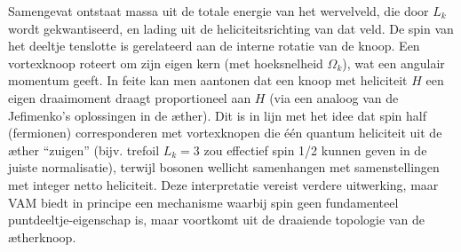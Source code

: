 Samengevat ontstaat massa uit de totale energie van het wervelveld, die door $L_k$ wordt gekwantiseerd, en lading uit de heliciteitsrichting van dat veld. De spin van het deeltje tenslotte is gerelateerd aan de interne rotatie van de knoop. Een vortexknoop roteert om zijn eigen kern (met hoeksnelheid $\Omega_k$), wat een angulair momentum geeft. In feite kan men aantonen dat een knoop met heliciteit $H$ een eigen draaimoment draagt proportioneel aan $H$ (via een analoog van de Jefimenko’s oplossingen in de æther). Dit is in lijn met het idee dat spin half (fermionen) corresponderen met vortexknopen die één quantum heliciteit uit de æther “zuigen” (bijv. trefoil $L_k=3$ zou effectief spin 1/2 kunnen geven in de juiste normalisatie), terwijl bosonen wellicht samenhangen met samenstellingen met integer netto heliciteit. Deze interpretatie vereist verdere uitwerking, maar VAM biedt in principe een mechanisme waarbij spin geen fundamenteel puntdeeltje-eigenschap is, maar voortkomt uit de draaiende topologie van de ætherknoop.